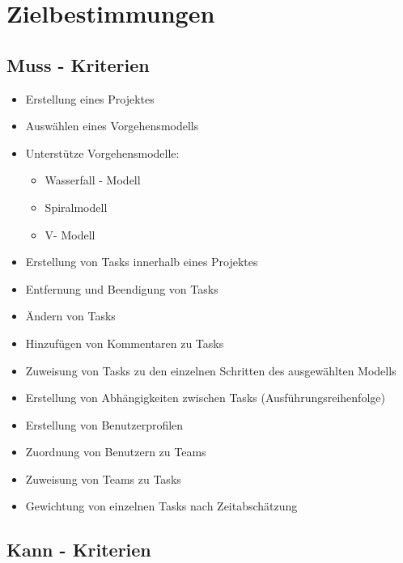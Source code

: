 
\section{Zielbestimmungen}

\subsection{Muss - Kriterien}
\begin{itemize}
	\item Erstellung eines Projektes
	\item Auswählen eines Vorgehensmodells
	\item Unterstütze Vorgehensmodelle:
	\begin{itemize}
		\item Wasserfall - Modell
		\item Spiralmodell
		\item V- Modell
	\end{itemize}
	\item Erstellung von Tasks innerhalb eines Projektes
	\item Entfernung und Beendigung von Tasks
	\item Ändern von Tasks
	\item Hinzufügen von Kommentaren zu Tasks
	\item Zuweisung von Tasks zu den einzelnen Schritten des ausgewählten Modells
	\item Erstellung von Abhängigkeiten zwischen Tasks (Ausführungsreihenfolge)
	\item Erstellung von Benutzerprofilen
	\item Zuordnung von Benutzern zu Teams
	\item Zuweisung von Teams zu Tasks
	\item Gewichtung von einzelnen Tasks nach Zeitabschätzung
\end{itemize}

\subsection{Kann - Kriterien}